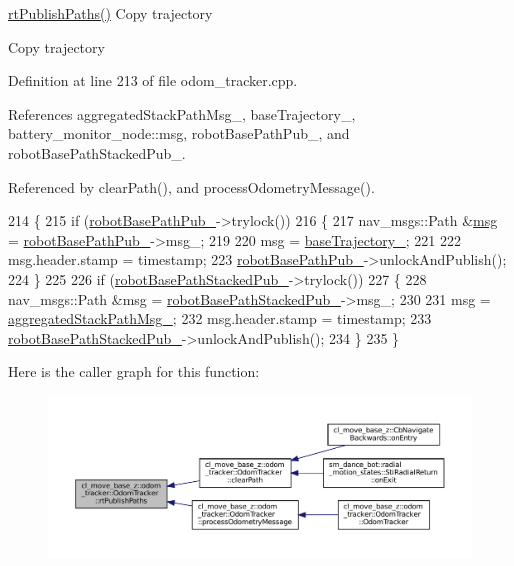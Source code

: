\hyperlink{classcl__move__base__z_1_1odom__tracker_1_1OdomTracker_a8f728f85d1f3f49f4b94e37052a59d6d}{rt\+Publish\+Paths()} Copy trajectory

Copy trajectory 

Definition at line 213 of file odom\+\_\+tracker.\+cpp.



References aggregated\+Stack\+Path\+Msg\+\_\+, base\+Trajectory\+\_\+, battery\+\_\+monitor\+\_\+node\+::msg, robot\+Base\+Path\+Pub\+\_\+, and robot\+Base\+Path\+Stacked\+Pub\+\_\+.



Referenced by clear\+Path(), and process\+Odometry\+Message().


\begin{DoxyCode}
214 \{
215   \textcolor{keywordflow}{if} (\hyperlink{classcl__move__base__z_1_1odom__tracker_1_1OdomTracker_a40a7cbb6bb6595e250e7c685c781613b}{robotBasePathPub\_}->trylock())
216   \{
217     nav\_msgs::Path &\hyperlink{namespacebattery__monitor__node_ab1920c64448816edd4064e494275fdff}{msg} = \hyperlink{classcl__move__base__z_1_1odom__tracker_1_1OdomTracker_a40a7cbb6bb6595e250e7c685c781613b}{robotBasePathPub\_}->msg\_;
219 
220     msg = \hyperlink{classcl__move__base__z_1_1odom__tracker_1_1OdomTracker_a466d18a86df049f0f680e043bb5ea91f}{baseTrajectory\_};
221 
222     msg.header.stamp = timestamp;
223     \hyperlink{classcl__move__base__z_1_1odom__tracker_1_1OdomTracker_a40a7cbb6bb6595e250e7c685c781613b}{robotBasePathPub\_}->unlockAndPublish();
224   \}
225 
226   \textcolor{keywordflow}{if} (\hyperlink{classcl__move__base__z_1_1odom__tracker_1_1OdomTracker_a7a2fb23e835ba7d63e69c8db819be876}{robotBasePathStackedPub\_}->trylock())
227   \{
228     nav\_msgs::Path &msg = \hyperlink{classcl__move__base__z_1_1odom__tracker_1_1OdomTracker_a7a2fb23e835ba7d63e69c8db819be876}{robotBasePathStackedPub\_}->msg\_;
230 
231     msg = \hyperlink{classcl__move__base__z_1_1odom__tracker_1_1OdomTracker_a0fb60113ace2791a1f1bbeed59946404}{aggregatedStackPathMsg\_};
232     msg.header.stamp = timestamp;
233     \hyperlink{classcl__move__base__z_1_1odom__tracker_1_1OdomTracker_a7a2fb23e835ba7d63e69c8db819be876}{robotBasePathStackedPub\_}->unlockAndPublish();
234   \}
235 \}
\end{DoxyCode}
Here is the caller graph for this function\+:
\nopagebreak
\begin{figure}[H]
\begin{center}
\leavevmode
\includegraphics[width=350pt]{classcl__move__base__z_1_1odom__tracker_1_1OdomTracker_a8f728f85d1f3f49f4b94e37052a59d6d_icgraph}
\end{center}
\end{figure}
